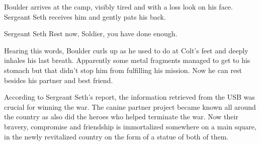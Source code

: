 \documentclass{screenplay}[2012/06/30]
\begin{document}

Boulder arrives at the camp, visibly tired and with a loss 
look on his face. Sergeant Seth receives him and gently pats
his back.

\begin{dialogue}{Sergeant Seth}
    Rest now, Soldier, you have done enough.
\end{dialogue}

Hearing this words, Boulder curls up as he used to do at 
Colt's feet and deeply inhales his last breath. Apparently
some metal fragments managed to get to his stomach but 
that didn't stop him from fulfilling his mission. Now he can 
rest besides his partner and best friend.

According to Sergeant Seth's report, the information retrieved
from the USB was crucial for winning the war. The canine partner
project became known all around the country as also did the 
heroes who helped terminate the war. Now their bravery, compromise
and friendship is immortalized somewhere on a main square, in the 
newly revitalized country on the form of a statue of both of them.

\fadeout
\theend
\end{document}
